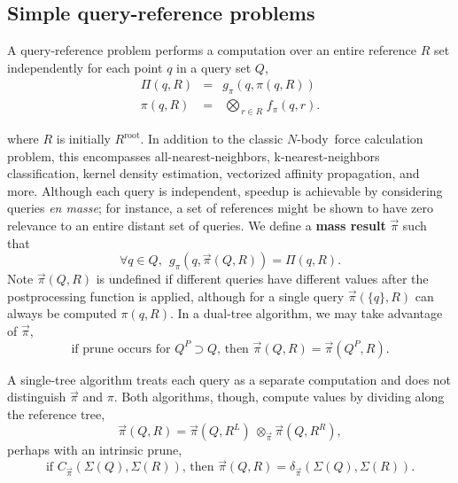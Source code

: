 \documentclass[times, leqno,twocolumn]{article}
\newcommand{\defterm}[1]{{\bf #1}}
\newcommand{\nbody}{$N$-body}
\newcommand{\kdroot}[1]{#1^{\text{root}}}
\newcommand{\kdleft}[1]{#1^{\!L}}
\newcommand{\kdright}[1]{#1^{\!R}}
\newcommand{\kdparent}[1]{#1^{\!P}}
\newcommand{\myOp}[1]{\mathop{\bigotimes\nolimits\!\!_{#1}}}
\newcommand{\myop}[1]{{\scriptstyle\:}\otimes_{\!#1}}
\newcommand{\letterqr}{\pi}
\newcommand{\outqr}{\Pi}
\newcommand{\inqr}{\pi}
\newcommand{\Opqr}{\myOp{\letterqr}}
\newcommand{\fqr}{f_{\letterqr}}
\newcommand{\gqr}{g_{\letterqr}}
\newcommand{\letterqrv}{\vec{\pi}}
\newcommand{\inqrv}{\vec{\pi}}
\newcommand{\opqrv}{\myop{\letterqrv}}
\newcommand{\deltaqrv}{\delta_{\letterqrv}}
\newcommand{\canpruneqrv}{C_{\letterqrv}}
\newcommand{\outstat}{\Sigma}
\begin{document}
\subsection{Simple query-reference problems}

A query-reference problem performs a computation over an entire reference $R$ set independently for each point $q$ in a query set $Q$,
\begin{eqnarray}
\outqr(q, R) &=& \gqr(q, \inqr(q, R))
\\
\inqr(q, R) &=& \Opqr_{r \in R} \fqr(q, r).
\end{eqnarray}

\noindent where $R$ is initially $\kdroot{R}$.
In addition to the classic \nbody\ force calculation problem, this encompasses all-nearest-neighbors, k-nearest-neighbors classification, kernel density estimation, vectorized affinity propagation, and more.
Although each query is independent, speedup is achievable by considering queries {\it en masse}; for instance, a set of references might be shown to have zero relevance to an entire distant set of queries.
We define a \defterm{mass result} $\inqrv$ such that
\begin{equation}
\forall q \in Q,~~ \gqr(q, \inqrv(Q, R)) = \outqr(q, R).
\end{equation}
\noindent Note $\inqrv(Q,R)$ is undefined if different queries have different values after the postprocessing function is applied, although for a single query $\inqrv(\{q\}, R)$ can always be computed $\inqr(q, R)$.
In a dual-tree algorithm, we may take advantage of $\inqrv$,
\begin{equation}
\text{if prune occurs for } \kdparent{Q} \supset Q \text{, then } \inqrv(Q, R) = \inqrv(\kdparent{Q}, R).
\label{eqn:parentqrv}
\end{equation}

\noindent
A single-tree algorithm treats each query as a separate computation and does not distinguish $\inqrv$ and $\inqr$.
Both algorithms, though, compute values by dividing along the reference tree,
\begin{equation}
\inqrv(Q, R) = \inqrv(Q, \kdleft{R}) \opqrv \inqrv(Q, \kdright{R}),
\label{eqn:dividepi}
\end{equation}
\noindent perhaps with an intrinsic prune,
\begin{equation}
\text{if } \canpruneqrv(\outstat(Q), \outstat(R)) \text{, then } \inqrv(Q, R) = \deltaqrv(\outstat(Q), \outstat(R)).
\label{eqn:prunepi}
\end{equation}
\end{document}
